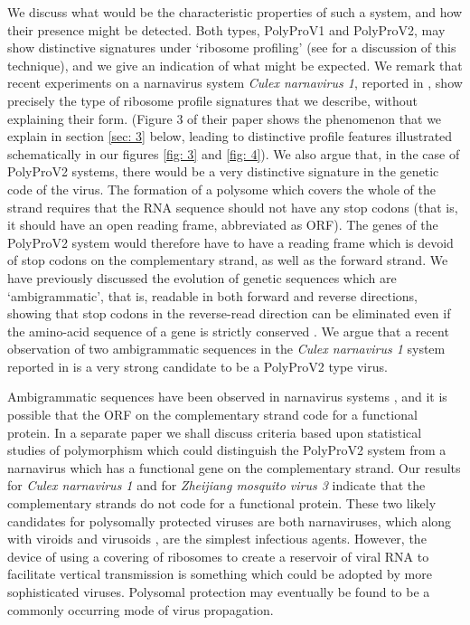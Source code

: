 \documentclass[12pt]{iopart}
\begin{document}
We discuss what would be the characteristic properties of such a system, and how their presence might 
be detected. Both types, PolyProV1 and PolyProV2, may show distinctive signatures 
under \lq ribosome profiling' (see \cite{Ingolia2009,Ingolia2012,Bra+15,Ingolia2016} for a discussion of this technique), 
and we give an indication of what might be expected. We remark that recent 
experiments on a narnavirus system \emph{Culex narnavirus 1}, reported in \cite{Ret+20}, show 
precisely the type of ribosome profile signatures that we describe, without explaining their form. (Figure 3
of their paper shows the phenomenon that we explain in section \ref{sec: 3} below, leading to distinctive 
profile features illustrated schematically in our figures \ref{fig: 3} and \ref{fig: 4}).
We also argue that, in the case of PolyProV2 systems, 
there would be a very distinctive signature in the genetic code of the virus. The formation of a polysome 
which covers the whole of the strand requires that the RNA sequence should not have any stop codons
(that is, it should have an open reading frame, abbreviated as ORF). The genes of the PolyProV2 system
would therefore have to have a reading frame which is devoid of stop codons on the complementary strand, 
as well as the forward strand. We have previously discussed the evolution of genetic sequences 
which are \lq ambigrammatic', that is, readable in both forward and reverse directions, showing that 
stop codons in the reverse-read direction can be eliminated even if the amino-acid sequence of a 
gene is strictly conserved \cite{DeR+19}. We argue that a recent observation of two  
ambigrammatic sequences in the \emph{Culex narnavirus 1} system reported in \cite{Bat+20,Ret+20} is a 
very strong candidate to be a PolyProV2 type virus.

Ambigrammatic sequences have been observed in narnavirus systems 
\cite{Cook2013,DeR+19,Cep20,Bat+20,Ret+20,Dudas2021}, and it is possible 
that the ORF on the complementary strand code for a functional protein. In a separate 
paper \cite{Dudas2021} we shall discuss criteria based upon statistical studies of polymorphism 
which could distinguish the PolyProV2 system from a narnavirus which has a functional gene 
on the complementary strand. Our results for  \emph{Culex narnavirus 1} and for \emph{Zheijiang mosquito virus 3}
indicate that the complementary strands do not code for a functional protein.
These two likely candidates for polysomally protected viruses are both narnaviruses, which along with 
viroids and virusoids \cite{Sym91}, are the simplest infectious agents. However, the device of using a covering of 
ribosomes to create a reservoir of viral RNA to facilitate vertical transmission is something which could be 
adopted by more sophisticated viruses. Polysomal protection may eventually be found to be a commonly 
occurring mode of virus propagation.
\end{document}
